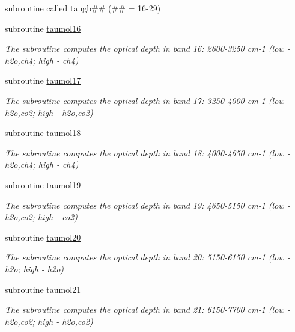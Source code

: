 \begin{DoxyCompactItemize}
\begin{DoxyCompactList}
 subroutine called taugb\#\# (\#\# = 16-\/29) \end{DoxyCompactList}\item 
subroutine \hyperlink{zhang__orig_2radsw__main_8f_a8702f5f6285ff1a5cbfad740545fffb6}{taumol16}
\begin{DoxyCompactList}\small\item\em The subroutine computes the optical depth in band 16\+: 2600-\/3250 cm-\/1 (low -\/ h2o,ch4; high -\/ ch4) \end{DoxyCompactList}\item 
subroutine \hyperlink{zhang__orig_2radsw__main_8f_ae46d1c061726bcde426caadd80b1fd80}{taumol17}
\begin{DoxyCompactList}\small\item\em The subroutine computes the optical depth in band 17\+: 3250-\/4000 cm-\/1 (low -\/ h2o,co2; high -\/ h2o,co2) \end{DoxyCompactList}\item 
subroutine \hyperlink{zhang__orig_2radsw__main_8f_a06f6f2b0ef60df93c267a667a2e1aa36}{taumol18}
\begin{DoxyCompactList}\small\item\em The subroutine computes the optical depth in band 18\+: 4000-\/4650 cm-\/1 (low -\/ h2o,ch4; high -\/ ch4) \end{DoxyCompactList}\item 
subroutine \hyperlink{zhang__orig_2radsw__main_8f_a776a0d78fda9f4fd0f1153b55be597df}{taumol19}
\begin{DoxyCompactList}\small\item\em The subroutine computes the optical depth in band 19\+: 4650-\/5150 cm-\/1 (low -\/ h2o,co2; high -\/ co2) \end{DoxyCompactList}\item 
subroutine \hyperlink{zhang__orig_2radsw__main_8f_a6eb9a29728a986ea6b15240adebd4a0c}{taumol20}
\begin{DoxyCompactList}\small\item\em The subroutine computes the optical depth in band 20\+: 5150-\/6150 cm-\/1 (low -\/ h2o; high -\/ h2o) \end{DoxyCompactList}\item 
subroutine \hyperlink{zhang__orig_2radsw__main_8f_a54619c48147f35da2d7855dc488c0ff4}{taumol21}
\begin{DoxyCompactList}\small\item\em The subroutine computes the optical depth in band 21\+: 6150-\/7700 cm-\/1 (low -\/ h2o,co2; high -\/ h2o,co2) \end{DoxyCompactList}\item 

\end{DoxyCompactItemize}
